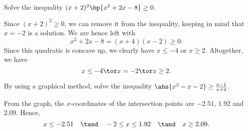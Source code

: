 \begin{problem}
    Solve the inequality $(x + 2)^2 \bp{x^2 + 2x - 8} \geq 0$.
\end{problem}
\begin{solution}
    Since $(x+2)^2 \geq 0$, we can remove it from the inequality, keeping in mind that $x = -2$ is a solution. We are hence left with \[x^2 + 2x - 8 = (x+4)(x-2) \geq 0.\] Since this quadratic is concave up, we clearly have $x \leq -4$ or $x \geq 2$. Altogether, we have \[x \leq -4 \tor x = -2 \tor x \geq 2.\]
\end{solution}

\begin{problem}
    By using a graphical method, solve the inequality $\abs{x^2 - x - 2} \geq \frac{x-1}{x+2}$.
\end{problem}
\begin{solution}
    \begin{figure}[H]
    \centering
    \end{figure}

    From the graph, the $x$-coordinates of the intersection points are $-2.51$, $1.92$ and $2.09$. Hence, \[x \leq -2.51 \quad \tand \quad -2 \leq x \leq 1.92 \quad \tand \quad x \geq 2.09.\]
\end{solution}

